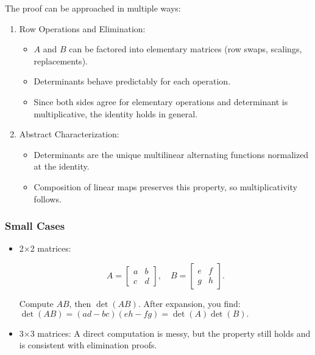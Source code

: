 \documentclass[
  letterpaper,
  DIV=11,
  numbers=noendperiod]{scrreprt}
\providecommand{\tightlist}{%
  \setlength{\itemsep}{0pt}\setlength{\parskip}{0pt}}
\begin{document}
The proof can be approached in multiple ways:

\begin{enumerate}
\def\labelenumi{\arabic{enumi}.}
\item
  Row Operations and Elimination:

  \begin{itemize}
  \tightlist
  \item
    \(A\) and \(B\) can be factored into elementary matrices (row swaps,
    scalings, replacements).
  \item
    Determinants behave predictably for each operation.
  \item
    Since both sides agree for elementary operations and determinant is
    multiplicative, the identity holds in general.
  \end{itemize}
\item
  Abstract Characterization:

  \begin{itemize}
  \tightlist
  \item
    Determinants are the unique multilinear alternating functions
    normalized at the identity.
  \item
    Composition of linear maps preserves this property, so
    multiplicativity follows.
  \end{itemize}
\end{enumerate}

\subsubsection{Small Cases}\label{small-cases}

\begin{itemize}
\item
  2×2 matrices:

  \[
  A = \begin{bmatrix} a & b \\ c & d \end{bmatrix}, \quad 
  B = \begin{bmatrix} e & f \\ g & h \end{bmatrix}.
  \]

  Compute \(AB\), then \(\det(AB)\). After expansion, you find:
  \(\det(AB) = (ad - bc)(eh - fg) = \det(A)\det(B).\)
\item
  3×3 matrices: A direct computation is messy, but the property still
  holds and is consistent with elimination proofs.
\end{itemize}
\end{document}
